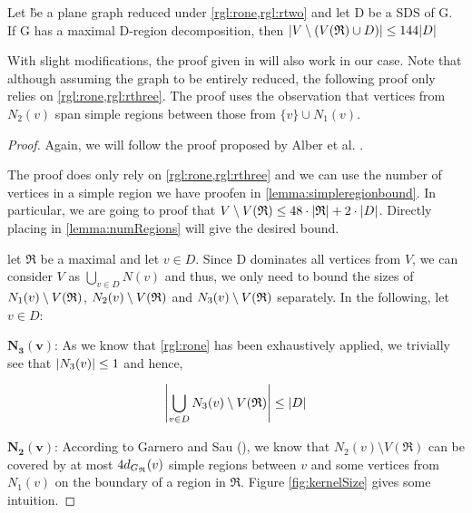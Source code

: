 \begin{proposition}\label{lemma:outside}
    Let \G be a plane graph reduced under \cref*{rgl:rone,rgl:rtwo} and let D be a SDS of G. If G has a maximal D-region decomposition, then $\abs{V \setminus (V(\mathfrak{R}) \cup D)} \leq 144 \abs{D}$
\end{proposition}

With slight modifications, the proof given in \cite{Garnero2014} will also work in our case. Note that although assuming the graph to be entirely reduced, the following proof only relies on \cref*{rgl:rone,rgl:rthree}. The proof uses the observation that vertices from $N_2(v)$ span simple regions between those from $\{v\} \cup N_1(v)$.

\begin{proof}
    Again, we will follow the proof proposed by Alber et al. \cite[Proposition 2]{Alber2004}. 
    
    The proof does only rely on \cref{rgl:rone,rgl:rthree} and we can use the number of vertices in a simple region we have proofen in \cref{lemma:simpleregionbound}. In particular, we are going to proof that $V \setminus V(\mathfrak{R}) \leq 48 \cdot \abs{\mathfrak{R}} + 2 \cdot \abs{D}$. Directly placing in \cref{lemma:numRegions} will give the desired bound.
    
    let $\mathfrak{R}$ be a maximal \dreg and let $v \in D$. Since D dominates all vertices from $V$, we can consider $V$ as $\bigcup_{v \in D}N(v)$ and thus, we only need to bound the sizes of $N_1(v)\setminus {V(\mathfrak{R})} $, $N_2(v) \setminus {V(\mathfrak{R})} $ and $N_3(v) \setminus {V(\mathfrak{R})} $ separately. In the following, let $v \in D$:
    
    \noindent$\mathbf{N_3(v)}$: As we know that \cref{rgl:rone} has been exhaustively applied, we trivially see that $\abs{N_3(v)} \leq 1$ and hence, 
    
    \[\abs{\bigcup_{v \in D}N_3(v) \setminus V(\mathfrak{R})} \leq \abs{D}\]
    
    \noindent$\mathbf{N_2(v)}$: According to Garnero and Sau (\cite[Proposition 2]{Garnero2018}), we know that $N_2(v) \setminus V(\mathfrak{R})$ can be covered by at most $4 d_{G_{\mathfrak{R}}}(v)$ simple regions between $v$ and some vertices from $N_1(v)$ on the boundary of a region in $\mathfrak{R}$. Figure \ref{fig:kernelSize} gives some intuition.
    

\end{proof}
